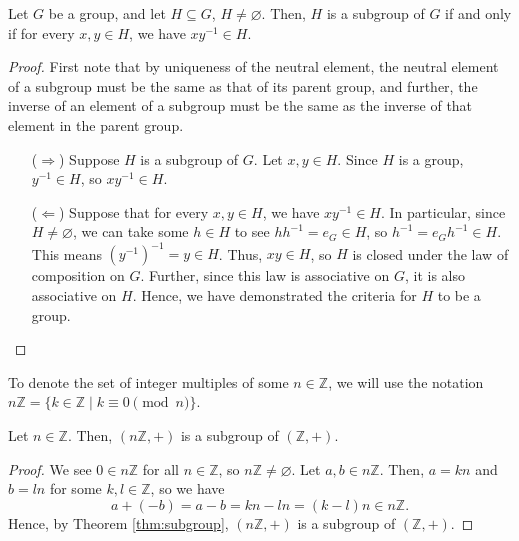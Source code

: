 \begin{thm}\label{thm:subgroup}
Let $ G $ be a group, and let $ H\subseteq G $, $ H\neq\varnothing $. Then, $ H $ is a subgroup of $ G $ if and only if for every $ x,y\in H $, we have $ xy^{-1}\in H $.
\end{thm}
\begin{proof}
First note that by uniqueness of the neutral element, the neutral element of a subgroup must be the same as that of its parent group, and further, the inverse of an element of a subgroup must be the same as the inverse of that element in the parent group.

\begin{enumerate}
    \item[($ \Rightarrow $)] Suppose $ H $ is a subgroup of $ G $. Let $ x,y\in H $. Since $ H $ is a group, $ y^{-1}\in H $, so $ xy^{-1}\in H $.

    \item[($ \Leftarrow $)] Suppose that for every $ x,y\in H $, we have $ xy^{-1}\in H $. In particular, since $ H\neq\varnothing $, we can take some $ h\in H $ to see $ hh^{-1}=e_G\in H $, so $ h^{-1}=e_Gh^{-1}\in H $. This means $ (y^{-1})^{-1}=y\in H $. Thus, $ xy\in H $, so $ H $ is closed under the law of composition on $ G $. Further, since this law is associative on $ G $, it is also associative on $ H $. Hence, we have demonstrated the criteria for $ H $ to be a group.\qedhere
\end{enumerate}
\end{proof}

To denote the set of integer multiples of some $ n\in\mathbb{Z} $, we will use the notation $ n\mathbb{Z}=\{k\in\mathbb{Z}\mid k\equiv 0\pmod n\} $.

\begin{prop}
Let $ n\in\mathbb{Z} $. Then, $ (n\mathbb{Z},+) $ is a subgroup of $ (\mathbb{Z},+) $.
\end{prop}
\begin{proof}
We see $ 0\in n\mathbb{Z} $ for all $ n\in\mathbb{Z} $, so $ n\mathbb{Z}\neq\varnothing $. Let $ a,b\in n\mathbb{Z} $. Then, $ a=kn $ and $ b=ln $ for some $ k,l\in\mathbb{Z} $, so we have
\begin{equation*}
    a+(-b)=a-b=kn-ln=(k-l)n\in n\mathbb{Z}.
\end{equation*}
Hence, by Theorem \ref{thm:subgroup}, $ (n\mathbb{Z},+) $ is a subgroup of $ (\mathbb{Z},+) $.
\end{proof}

